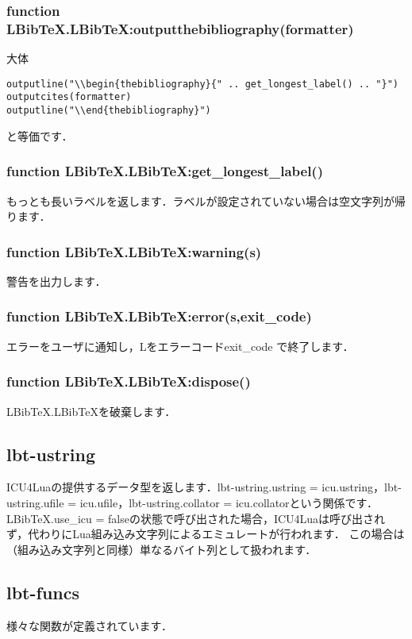 \documentclass[dvipdfmx,a4paper]{jsarticle}
\DeclareRobustCommand{\LBibTeX}{L\BibTeX}
\begin{document}
\subsubsection{function LBibTeX.LBibTeX:outputthebibliography(formatter)}
大体
\begin{lstlisting}
outputline("\\begin{thebibliography}{" .. get_longest_label() .. "}")
outputcites(formatter)
outputline("\\end{thebibliography}")
\end{lstlisting}
と等価です．

\subsubsection{function LBibTeX.LBibTeX:get\_longest\_label()}
もっとも長いラベルを返します．ラベルが設定されていない場合は空文字列が帰ります．

\subsubsection{function LBibTeX.LBibTeX:warning(s)}
警告を出力します．

\subsubsection{function LBibTeX.LBibTeX:error(s,exit\_code)}
エラーをユーザに通知し，\LBibTeX をエラーコードexit\_code で終了します．

\subsubsection{function LBibTeX.LBibTeX:dispose()}
LBibTeX.LBibTeXを破棄します．

\subsection{lbt-ustring}
ICU4Luaの提供するデータ型を返します．lbt-ustring.ustring = icu.ustring，lbt-ustring.ufile = icu.ufile，lbt-ustring.collator = icu.collatorという関係です．
LBibTeX.use\_icu = falseの状態で呼び出された場合，ICU4Luaは呼び出されず，代わりにLua組み込み文字列によるエミュレートが行われます．
この場合は（組み込み文字列と同様）単なるバイト列として扱われます．

\subsection{lbt-funcs}
様々な関数が定義されています．
\end{document}
